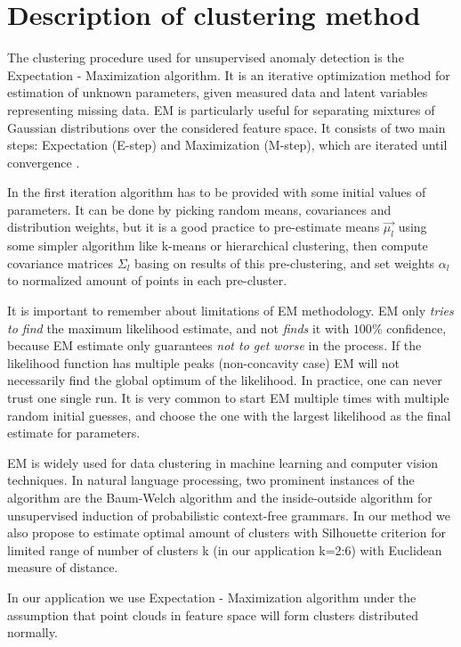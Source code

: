 \section{Description of clustering method}
The clustering procedure used for unsupervised anomaly detection is the Expectation - Maximization algorithm. It is an iterative optimization method for estimation of unknown parameters, given measured data and latent variables representing missing data. EM is particularly useful for separating mixtures of Gaussian distributions over the considered feature space. It consists of two main steps: Expectation (E-step) and Maximization (M-step), which are iterated until convergence \cite{Dempster,Hastie,Neal,Sundberg}. \par
In the first iteration algorithm has to be provided with some initial values of parameters. It can be done by picking random means, covariances and distribution weights, but it is a good practice to pre-estimate means $\overrightarrow{\mu_{l}}$ using some simpler algorithm like k-means or hierarchical clustering, then compute covariance matrices $\Sigma_{l}$ basing on results of this pre-clustering, and set weights $\alpha_{l}$ to normalized amount of points in each pre-cluster.\par
It is important to remember about limitations of EM methodology. EM only \emph{tries to find} the maximum likelihood estimate, and not \emph{finds} it with $100$\% confidence, because EM estimate only guarantees \emph{not to get worse} in the process. If the likelihood function has multiple peaks (non-concavity case) EM will not necessarily find the global optimum of the likelihood. In practice, one can never trust one single run. It is very common to start EM multiple times with multiple random initial guesses, and choose the one with the largest likelihood as the final estimate for parameters.\par 
EM is widely used for data clustering in machine learning and computer vision techniques. In natural language processing, two prominent instances of the algorithm are the Baum-Welch algorithm and the inside-outside algorithm for unsupervised induction of probabilistic context-free grammars. In our method we also propose to estimate optimal amount of clusters with Silhouette criterion \cite{Kaufman,Rouseeuw} for limited range of number of clusters k (in our application k=2:6) with Euclidean measure of distance.\par
In our application we use Expectation - Maximization algorithm under the assumption that point clouds in feature space will form clusters distributed normally. \par

